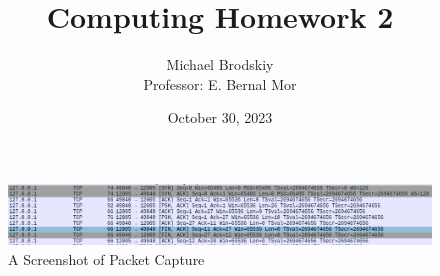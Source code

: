 


\title{Computing Homework 2}
\date{October 30, 2023}
\author{Michael Brodskiy\\ \small Professor: E. Bernal Mor}



\maketitle

\begin{figure}[H]
  \centering
  \includegraphics[width=.9\textwidth]{Figures/Capture.png}
  \caption{A Screenshot of Packet Capture}
  \label{fig:1}
\end{figure}

